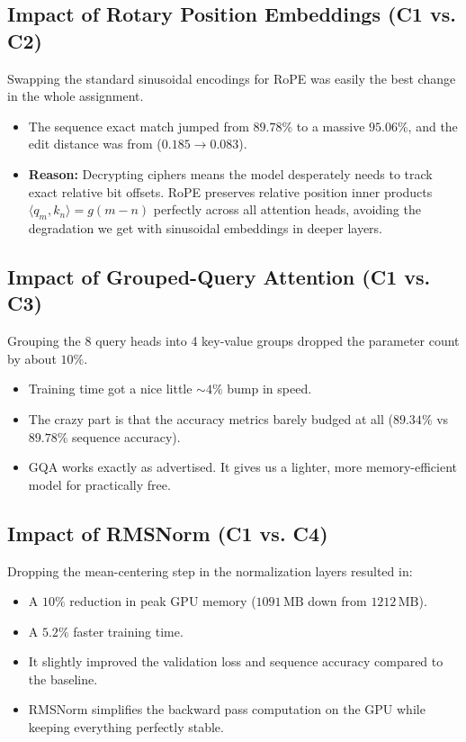 \documentclass[12pt,a4paper]{article}
\begin{document}
\subsection{Impact of Rotary Position Embeddings (C1 vs. C2)}
Swapping the standard sinusoidal encodings for RoPE was easily the best change in the whole assignment. 
\begin{itemize}
    \item The sequence exact match jumped from $89.78\%$ to a massive \textbf{$95.06\%$}, and the edit distance was from  ($0.185 \to 0.083$).
    \item \textbf{Reason:} Decrypting ciphers means the model desperately needs to track exact relative bit offsets. RoPE preserves relative position inner products $\langle q_m, k_n \rangle = g(m-n)$ perfectly across all attention heads, avoiding the degradation we get with sinusoidal embeddings in deeper layers.
\end{itemize}

\subsection{Impact of Grouped-Query Attention (C1 vs. C3)}
Grouping the 8 query heads into 4 key-value groups dropped the parameter count by about $10\%$.
\begin{itemize}
    \item Training time got a nice little $\sim 4\%$ bump in speed.
    \item The crazy part is that the accuracy metrics barely budged at all ($89.34\%$ vs $89.78\%$ sequence accuracy).
    \item GQA works exactly as advertised. It gives us a lighter, more memory-efficient model for practically free.
\end{itemize}

\subsection{Impact of RMSNorm (C1 vs. C4)}
Dropping the mean-centering step in the normalization layers resulted in:
\begin{itemize}
    \item A \textbf{$10\%$} reduction in peak GPU memory ($1091\,\text{MB}$ down from $1212\,\text{MB}$).
    \item A \textbf{$5.2\%$} faster training time.
    \item It slightly improved the validation loss and sequence accuracy compared to the baseline.
    \item RMSNorm simplifies the backward pass computation on the GPU while keeping everything perfectly stable.
\end{itemize}
\end{document}
